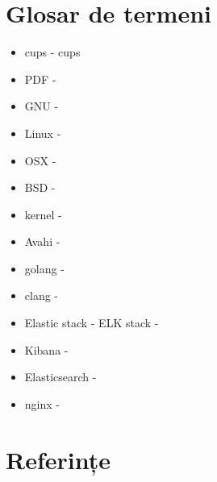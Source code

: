 \documentclass[12pt]{report}
\begin{document}
\chapter{Glosar de termeni}
\begin{itemize}
\item \acrshort{cups} - \acrlong{cups}
\item PDF - 
\item GNU - 
\item Linux -  
\item OSX - 
\item BSD - 
\item kernel - 
\item Avahi - 
\item golang - 
\item clang - 
\item Elastic stack - ELK stack - 
\item Kibana - 
\item Elasticsearch - 
\item nginx -
\end{itemize}

\chapter{Referințe}

\clearpage

\printglossaries
\end{document}
